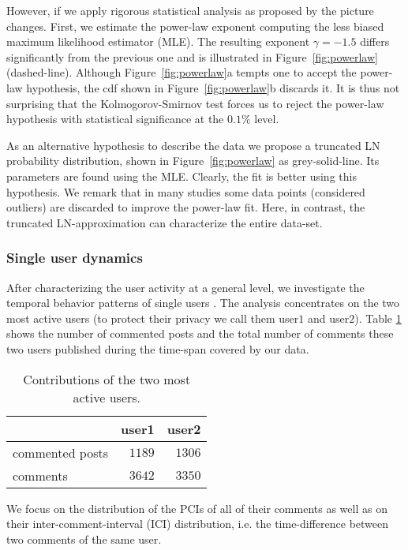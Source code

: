 \documentclass[twoside,11pt]{article}
\begin{document}
However, if we apply rigorous statistical analysis as proposed by 
\citet{goldstein2004} the picture changes.  First,
we estimate the power-law exponent computing the less biased maximum
likelihood estimator (MLE).  The resulting exponent $\gamma = -1.5$
differs significantly from the previous one and is illustrated in
Figure~\ref{fig:powerlaw} (dashed-line).  Although
Figure~\ref{fig:powerlaw}a tempts one to accept the power-law
hypothesis, the cdf shown in Figure~\ref{fig:powerlaw}b discards it.
It is thus not surprising that the Kolmogorov-Smirnov test forces us
to reject the power-law hypothesis with statistical significance at
the $0.1\%$ level.

As an alternative hypothesis to describe the data we propose a
truncated LN probability distribution, shown in
Figure~\ref{fig:powerlaw} as grey-solid-line. Its parameters are found
using the MLE.  Clearly, the fit is better using this hypothesis.  We
remark that in many studies some data points (considered outliers) are
discarded to improve the power-law fit.  Here, in contrast, the
truncated LN-approximation can characterize the entire data-set.

\subsubsection{Single user dynamics} \noindent 
After characterizing the user activity at a general level, we
investigate the temporal behavior patterns of single users . The
analysis concentrates on the two most active users (to protect their
privacy we call them user$1$ and user$2$). Table \ref{table:active}
shows the number of commented posts and the total number of comments
these two users published during the time-span covered by our data.
\vspace{-12pt}
\begin{table}[!hb]\centering
\caption{Contributions of the two most active users.}
\begin{tabular}{lrr} 
& user1                     & user2\\
\hline 
commented posts & $1189$ & $1306$ \\
comments        & $3642$ & $3350$ 
\end{tabular}
\label{table:active}
\end{table}

\noindent
We focus on the distribution of the PCIs of all of their comments as
well as on their inter-comment-interval (ICI) distribution, i.e.  the
time-difference between two comments of the same user.
\end{document}
